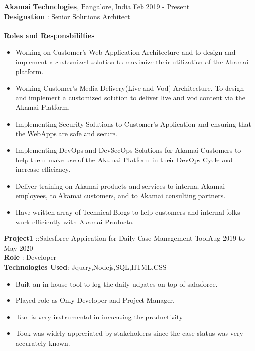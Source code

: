 \documentclass{resumeclass}
\begin{document}
\begin{resume}
  {\large \textbf{Akamai Technologies}, Bangalore, India} \hfill   Feb 2019 - Present\\[0.5pt]
  \textbf{Designation} : Senior Solutions Architect \\ \\
  \textbf{Roles and Responsbililties} 
   \begin{itemize} \itemsep -2pt
    \item Working on Customer’s Web Application Architecture and to design and implement a customized solution to maximize their utilization of the Akamai platform.
    \item Working Customer’s Media Delivery(Live and Vod) Architecture. To design and implement a customized solution to deliver live and vod content via the Akamai Platform.
    \item Implementing Security Solutions to Customer’s Application and ensuring that the WebApps are safe and secure.
    \item Implementing DevOps and DevSecOps Solutions for Akamai Customers to help them make use of the Akamai Platform in their DevOps Cycle and increase efficiency.
    \item Deliver training on Akamai products and services to internal Akamai employees, to Akamai customers, and to Akamai consulting partners.
    \item Have written array of Technical Blogs to help customers and internal folks work efficiently with Akamai Products.
  \end{itemize} \vspace{-6pt}
  
  
  \textbf{Project1} ::Salesforce Application for Daily Case Management Tool\hfill      Aug 2019 to May 2020 \\
  \textbf{Role} : Developer \\
  \textbf{Technologies Used}: Jquery,Nodejs,SQL,HTML,CSS
  
   \begin{itemize} \itemsep -2pt
    \item Built an in house tool to log the daily udpates on top of salesforce. 
    \item Played role as Only Developer and Project Manager. 
    \item Tool is very instrumental in increasing the productivity.
    \item Took was widely appreciated by stakeholders since the case status was very accurately known.
  \end{itemize} \vspace{-6pt}


\end{resume}
\end{document}
